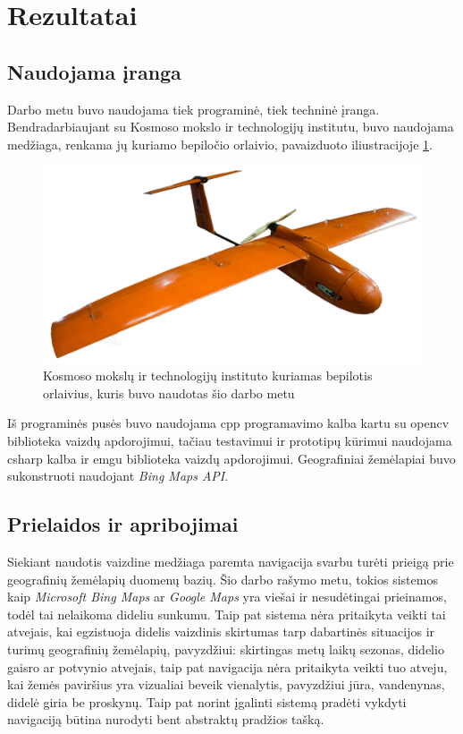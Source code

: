 \documentclass[a4paper,12pt]{article}
\begin{document}
	\clearpage
	\section{Rezultatai}
		
		\subsection{Naudojama įranga}		
		
			Darbo metu buvo naudojama tiek programinė, tiek techninė įranga.
			Bendradarbiaujant su Kosmoso mokslo ir technologijų institutu, buvo naudojama medžiaga, renkama jų kuriamo bepiločio orlaivio, pavaizduoto iliustracijoje \ref{fig:KMTI_UAV}.

			\begin{figure}[h]
				\includegraphics[width=\textwidth]{images/KMTI_UAV.png}
				\caption{Kosmoso mokslų ir technologijų instituto kuriamas bepilotis orlaivius, kuris buvo naudotas šio darbo metu}
				\label{fig:KMTI_UAV}
			\end{figure}
			
			Iš programinės pusės buvo naudojama \gls{cpp} programavimo kalba kartu su \gls{opencv} biblioteka vaizdų apdorojimui, tačiau testavimui ir prototipų kūrimui naudojama \gls{csharp} kalba ir \gls{emgu} biblioteka vaizdų apdorojimui. Geografiniai žemėlapiai buvo sukonstruoti naudojant \textit{Bing Maps API}.
	
		\subsection{Prielaidos ir apribojimai}		
			Siekiant naudotis vaizdine medžiaga paremta navigacija svarbu turėti	 prieigą prie geografinių žemėlapių duomenų bazių. Šio darbo rašymo metu, tokios sistemos kaip \textit{Microsoft Bing Maps} ar \textit{Google Maps} yra viešai ir nesudėtingai prieinamos, todėl tai nelaikoma dideliu sunkumu. Taip pat sistema nėra pritaikyta veikti tai atvejais, kai egzistuoja didelis vaizdinis skirtumas tarp dabartinės situacijos ir turimų geografinių žemėlapių, pavyzdžiui: skirtingas metų laikų sezonas, didelio gaisro ar potvynio atvejais, taip pat navigacija nėra pritaikyta veikti tuo atveju, kai žemės paviršius yra vizualiai beveik vienalytis, pavyzdžiui jūra, vandenynas, didelė giria be proskynų. Taip pat norint įgalinti sistemą pradėti vykdyti navigaciją būtina nurodyti bent abstraktų pradžios tašką.		
	
\end{document}
